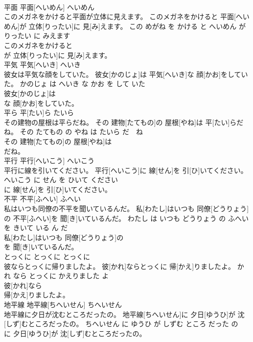 \documentclass[8pt]{extreport}
\begin{document}
\begin{CJK}{UTF8}{min}
\\	平面	平面[へいめん]	へいめん	
\\	このメガネをかけると平面が立体に見えます。	このメガネをかけると 平面[へいめん]が 立体[りったい]に 見[み]えます。	この めがね を かける と へいめん が りったい に みえます	
\\	このメガネをかけると
\\	が 立体[りったい]に 見[み]えます。			
\\	平気	平気[へいき]	へいき	
\\	彼女は平気な顔をしていた。	彼女[かのじょ]は 平気[へいき]な 顔[かお]をしていた。	かのじょ は へいき な かお を して いた	
\\	彼女[かのじょ]は
\\	な 顔[かお]をしていた。			
\\	平ら	平[たい]ら	たいら	
\\	その建物の屋根は平らだね。	その 建物[たてもの]の 屋根[やね]は 平[たい]らだね。	その たてもの の やね は たいら だ　ね	
\\	その 建物[たてもの]の 屋根[やね]は
\\	だね。			
\\	平行	平行[へいこう]	へいこう	
\\	平行に線を引いてください。	平行[へいこう]に 線[せん]を 引[ひ]いてください。	へいこう に せん を ひいて ください	
\\	に 線[せん]を 引[ひ]いてください。			
\\	不平	不平[ふへい]	ふへい	
\\	私はいつも同僚の不平を聞いているんだ。	私[わたし]はいつも 同僚[どうりょう]の 不平[ふへい]を 聞[き]いているんだ。	わたし は いつも どうりょう の ふへい を きいて いる ん だ	
\\	私[わたし]はいつも 同僚[どうりょう]の
\\	を 聞[き]いているんだ。			
\\	とっくに	とっくに	とっくに	
\\	彼ならとっくに帰りましたよ。	彼[かれ]ならとっくに 帰[かえ]りましたよ。	かれ なら とっくに かえりました よ	
\\	彼[かれ]なら
\\	帰[かえ]りましたよ。			
\\	地平線	地平線[ちへいせん]	ちへいせん	
\\	地平線に夕日が沈むところだったの。	地平線[ちへいせん]に 夕日[ゆうひ]が 沈[しず]むところだったの。	ちへいせん に ゆうひ が しずむ ところ だった の	
\\	に 夕日[ゆうひ]が 沈[しず]むところだったの。			

\end{CJK}
\end{document}
